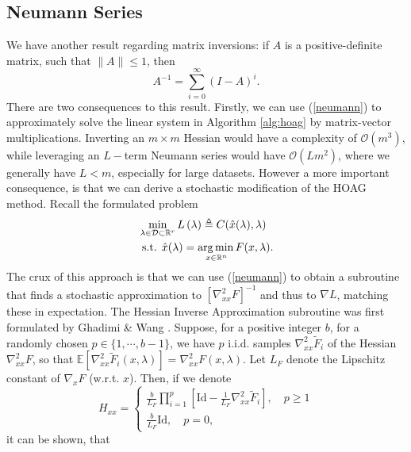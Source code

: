 \documentclass[11pt, twoside]{report}
\begin{document}
\subsection{Neumann Series}
\label{subsec: neumann}
We have another result regarding matrix inversions: if $A$ is a positive-definite matrix, such that $\|A\| \leq 1$, then
\begin{equation} \label{neumann} 
    A^{-1} = \sum^{\infty}_{i=0} (I-A)^i.
\end{equation}
There are two consequences to this result. Firstly, we can use (\ref{neumann}) to approximately solve the linear system in Algorithm \ref{alg:hoag} by matrix-vector multiplications. Inverting an $m \times m$ Hessian would have a complexity of $\mathcal{O}(m^3)$, while leveraging an $L-$term Neumann series would have $\mathcal{O}(Lm^2)$, where we generally have $L<m$, especially for large datasets. However a more important consequence, is that we can derive a stochastic modification of the HOAG method. Recall the formulated problem 
\begin{align} 
&\min _{\lambda \in \mathcal{D} \subset \mathbb{R}^r} L\left(\lambda \right) \triangleq C(\hat{x}(\lambda), \lambda) \label{outer_hoag_neu}\\
&\text { s.t. } \hat{x}(\lambda) =\underset{x \in \mathbb{R}^{n}} {\operatorname*{arg\, min \,}} {F(x, \lambda)}. \label{inner_hoag_neu}
\end{align}
The crux of this approach is that we can use (\ref{neumann}) to obtain a subroutine that finds a stochastic approximation to $[\nabla_{xx}^2 F]^{-1}$ and thus to $\nabla L$, matching these in expectation. The Hessian Inverse Approximation subroutine was first formulated by Ghadimi \& Wang \cite{ghadimi2018approximation}. Suppose, for a positive integer $b$, for a randomly chosen $p \in \{1,\cdots,b-1\}$, we have $p$ i.i.d. samples $\nabla^2_{xx} \tilde{F}_i$ of the Hessian  $\nabla^2_{xx} F$, so that $\mathbb{E}[\nabla^2_{xx} \tilde{F}_i(x,\lambda)] = \nabla^2_{xx} F(x,\lambda).$ Let $L_F$ denote the Lipschitz constant of $\nabla_x F$ (w.r.t. $x$). Then, if we denote
\begin{equation} \label{HIA}
    H_{xx} = \begin{cases}
        \frac{b}{L_F} \prod_{i=1}^p \left[\mathrm{Id} - \frac{1}{L_F}\nabla^2_{xx} \tilde{F}_i \right], \quad p \geq 1 \\
        \frac{b}{L_F} \mathrm{Id}, \quad p = 0,
    \end{cases}
\end{equation}
it can be shown, that
\end{document}
